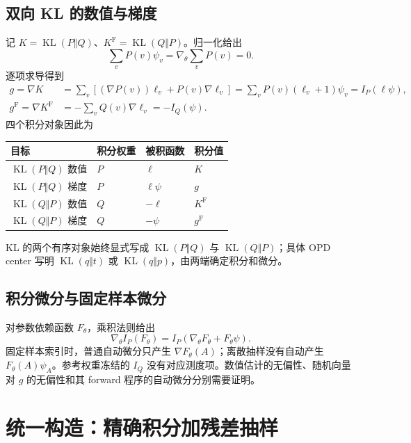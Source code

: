 \documentclass[lang=cn,scheme=chinese,openany]{../book/elegantbook}
\newcommand{\KL}{\operatorname{KL}}
\begin{document}
\subsection{双向 KL 的数值与梯度}
\label{est:four-targets}
记 $K=\KL(P\Vert Q)$、$K^{\mathrm F}=\KL(Q\Vert P)$。归一化给出
\begin{equation}
\sum_vP(v)\psi_v=\nabla_\theta\sum_vP(v)=0.
\end{equation}
逐项求导得到
\begin{align}
g=\nabla K
&=\sum_v[(\nabla P(v))\ell_v+P(v)\nabla\ell_v]
=\sum_vP(v)(\ell_v+1)\psi_v
=I_P(\ell\psi),\\
g^{\mathrm F}=\nabla K^{\mathrm F}
&=-\sum_vQ(v)\nabla\ell_v=-I_Q(\psi).
\end{align}
四个积分对象因此为
\begin{center}
\begin{tabular}{llll}
\toprule
目标 & 积分权重 & 被积函数 & 积分值\\
\midrule
$\KL(P\Vert Q)$ 数值 & $P$ & $\ell$ & $K$\\
$\KL(P\Vert Q)$ 梯度 & $P$ & $\ell\psi$ & $g$\\
$\KL(Q\Vert P)$ 数值 & $Q$ & $-\ell$ & $K^{\mathrm F}$\\
$\KL(Q\Vert P)$ 梯度 & $Q$ & $-\psi$ & $g^{\mathrm F}$\\
\bottomrule
\end{tabular}
\end{center}
KL 的两个有序对象始终显式写成 $\KL(P\Vert Q)$ 与 $\KL(Q\Vert P)$；具体 OPD center 写明 $\KL(q\Vert t)$ 或 $\KL(q\Vert p)$，由两端确定积分和微分。

\subsection{积分微分与固定样本微分}
\label{est:measure-derivative}
对参数依赖函数 $F_\theta$，乘积法则给出
\begin{equation}
\nabla_\theta I_P(F_\theta)
=I_P(\nabla_\theta F_\theta+F_\theta\psi).
\label{est:eq:kl-measure-derivative}
\end{equation}
固定样本索引时，普通自动微分只产生 $\nabla F_\theta(A)$；离散抽样没有自动产生 $F_\theta(A)\psi_A$。参考权重冻结的 $I_Q$ 没有对应测度项。数值估计的无偏性、随机向量对 $g$ 的无偏性和其 forward 程序的自动微分分别需要证明。



\section{统一构造：精确积分加残差抽样}
\label{est:sec:kl-residual-framework}
\end{document}
